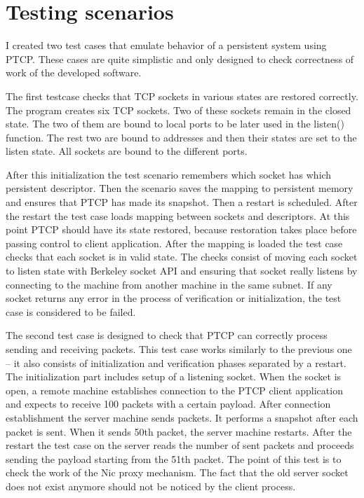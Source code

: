 \section{Testing scenarios}

I created two test cases that emulate behavior of a persistent system using 
PTCP. These cases are quite simplistic and only designed to check correctness
of work of the developed software.

The first testcase checks that TCP sockets in various states are restored
correctly. The program creates six TCP sockets. Two of these sockets remain in
the closed state. The two of them are bound to local ports to be later used in
the listen() function. The rest two are bound to addresses and then their states
are set to the listen state. All sockets are bound to the different ports.

After this initialization the test scenario remembers which socket has which
persistent descriptor. Then the scenario saves the mapping to persistent memory
and ensures that PTCP has made its snapshot. Then a restart is scheduled.
After the restart the test case loads mapping between sockets and descriptors.
At this point PTCP should have its state restored, because restoration takes
place before passing control to client application. After the mapping is loaded
the test case checks that each socket is in valid state. The checks consist of
moving each socket to listen state with Berkeley socket API and ensuring that
socket really listens by connecting to the machine from another machine in the
same subnet. If any socket returns any error in the process of verification or 
initialization, the test case is considered to be failed.

The second test case is designed to check that PTCP can correctly process
sending and receiving packets. This test case works similarly to the previous
one -- it also consists of initialization and verification phases separated by
a restart. The initialization part includes setup of a listening socket. When
the socket is open, a remote machine establishes connection to the PTCP client
application and expects to receive 100 packets with a certain payload. After
connection establishment the server machine sends packets. It performs a
snapshot after each packet is sent. When it sends 50th packet, the server
machine restarts. After the restart the test case on the server reads the number
of sent packets and proceeds sending the payload starting from the 51th packet.
The point of this test is to check the work of the Nic proxy mechanism. The fact
that the old server socket does not exist anymore should not be noticed by the
client process. 

